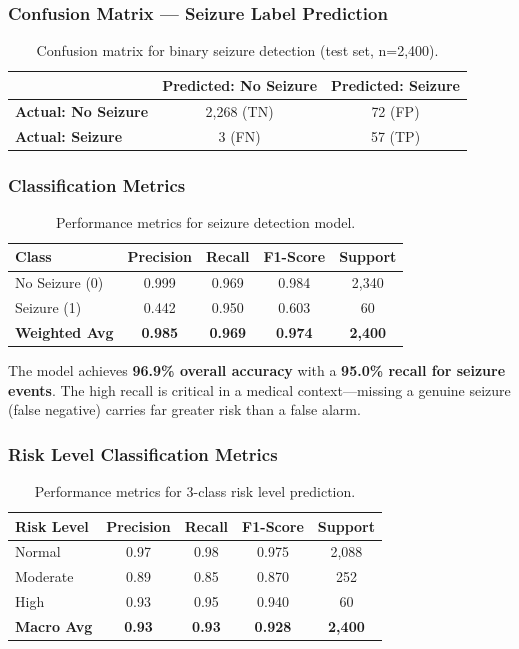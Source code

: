 \documentclass[12pt, a4paper, oneside]{report}
\begin{document}
\subsubsection{Confusion Matrix — Seizure Label Prediction}
\begin{table}[h!]
\centering
\caption{Confusion matrix for binary seizure detection (test set, n=2,400).}
\label{tab:confusion}
\begin{tabular}{|l|c|c|}
\hline
 & \textbf{Predicted: No Seizure} & \textbf{Predicted: Seizure} \\ \hline
\textbf{Actual: No Seizure} & 2,268 (TN) & 72 (FP) \\ \hline
\textbf{Actual: Seizure} & 3 (FN) & 57 (TP) \\ \hline
\end{tabular}
\end{table}

\subsubsection{Classification Metrics}
\begin{table}[h!]
\centering
\caption{Performance metrics for seizure detection model.}
\label{tab:metrics}
\begin{tabular}{|l|c|c|c|c|}
\hline
\textbf{Class} & \textbf{Precision} & \textbf{Recall} & \textbf{F1-Score} & \textbf{Support} \\ \hline
No Seizure (0) & 0.999 & 0.969 & 0.984 & 2,340 \\ \hline
Seizure (1) & 0.442 & 0.950 & 0.603 & 60 \\ \hline
\textbf{Weighted Avg} & \textbf{0.985} & \textbf{0.969} & \textbf{0.974} & \textbf{2,400} \\ \hline
\end{tabular}
\end{table}

The model achieves \textbf{96.9\% overall accuracy} with a \textbf{95.0\% recall for seizure events}. The high recall is critical in a medical context---missing a genuine seizure (false negative) carries far greater risk than a false alarm.

\subsubsection{Risk Level Classification Metrics}
\begin{table}[h!]
\centering
\caption{Performance metrics for 3-class risk level prediction.}
\label{tab:riskmetrics}
\begin{tabular}{|l|c|c|c|c|}
\hline
\textbf{Risk Level} & \textbf{Precision} & \textbf{Recall} & \textbf{F1-Score} & \textbf{Support} \\ \hline
Normal & 0.97 & 0.98 & 0.975 & 2,088 \\ \hline
Moderate & 0.89 & 0.85 & 0.870 & 252 \\ \hline
High & 0.93 & 0.95 & 0.940 & 60 \\ \hline
\textbf{Macro Avg} & \textbf{0.93} & \textbf{0.93} & \textbf{0.928} & \textbf{2,400} \\ \hline
\end{tabular}
\end{table}
\end{document}
